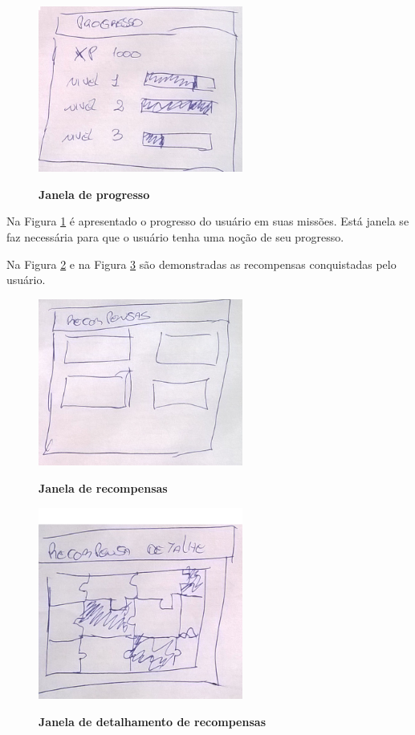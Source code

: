 \documentclass[
	12pt,				%
	oneside,			%
	a4paper,			%
	english,			%
	french,				%
	spanish,			%
	brazil,				%
	]{abntex2}
\begin{document}
\begin{figure}[ht]
\centering
\caption{\textbf{Janela de progresso}}
\includegraphics[width=0.6\textwidth]{imagens/proposta_progresso.png}
\sourceAuthor
\label{fig:janelaProgresso}
\end{figure}

Na Figura \ref{fig:janelaProgresso} é apresentado o progresso do usuário em suas missões. Está janela se faz necessária para que o usuário tenha uma noção de seu progresso.

Na Figura \ref{fig:janelaRecompensa} e na Figura \ref{fig:janelaRecompensaDetalhe} são demonstradas as recompensas conquistadas pelo usuário.

\begin{figure}[ht]
\centering
\caption{\textbf{Janela de recompensas}}
\includegraphics[width=0.6\textwidth]{imagens/proposta_recompensa.png}
\sourceAuthor
\label{fig:janelaRecompensa}
\end{figure}

\begin{figure}[ht]
\centering
\caption{\textbf{Janela de detalhamento de recompensas}}
\includegraphics[width=0.6\textwidth]{imagens/proposta_recompensa_detalhe.png}
\sourceAuthor
\label{fig:janelaRecompensaDetalhe}
\end{figure}
\end{document}
